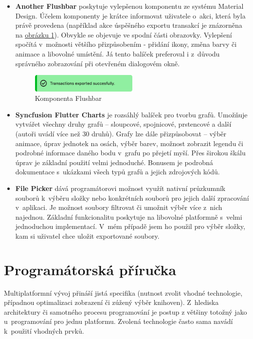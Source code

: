 \documentclass[
  biblatex,
  figures=true,
  tables=false,
  glossaries,
  index
]{kidiplom}
\begin{document}
\begin{itemize}
  \item \textbf{Another Flushbar} \cite{flushbar} poskytuje vylepšenou komponentu  ze systému Material Design. Účelem komponenty je krátce informovat uživatele o~akci, která byla právě provedena (například akce úspěšného exportu transakcí je znázorněna na \hyperref[fig:flushbar]{obrázku \ref{fig:flushbar}}). Obvykle se objevuje ve spodní části obrazovky. Vylepšení spočítá v~možnosti většího přizpůsobením - přidání ikony, změna barvy či animace a libovolné umístění. Já tento balíček preferoval i z~důvodu správného zobrazování při otevřeném dialogovém okně.

  \begin{figure}
    \centering
    \includegraphics[width=0.5\textwidth]{images/flushbar.pdf}
    \caption{Komponenta Flushbar}
    \label{fig:flushbar}
  \end{figure}
      
  \item \textbf{Syncfusion Flutter Charts} \cite{syncfusion-charts} je rozsáhlý balíček pro tvorbu grafů. Umožňuje vytvářet všechny druhy grafů -- sloupcové, spojnicové, prstencové a další (autoři uvádí více než 30 druhů). Grafy lze dále přizpůsobovat -- výběr animace, úprav jednotek na osách, výběr barev, možnost zobrazit legendu či podrobné informace daného bodu v~grafu po přejetí myší. Přes širokou škálu úprav je základní použití velmi jednoduché. Bonusem je podrobná dokumentace s~ukázkami všech typů grafů a jejich zdrojových kódů.
  \item \textbf{File Picker} \cite{file-picker} dává programátorovi možnost využít nativní průzkumník souborů k~výběru složky nebo konkrétních souborů pro jejich další zpracování v~aplikaci. Je možnost soubory filtrovat či umožnit výběr více z~nich najednou. Základní funkcionalitu poskytuje na libovolné platformně s~velmi jednoduchou implementací. V~mém případě jsem ho použil pro výběr složky, kam si uživatel chce uložit exportované soubory. 
\end{itemize}


\section{Programátorská příručka}

Multiplatformní vývoj přináší jistá specifika (nutnost zvolit vhodné technologie, případnou optimalizaci zobrazení či zúžený výběr knihoven). Z~hlediska architektury či samotného procesu programování je postup z většiny totožný jako u~programování pro jednu platformu. Zvolená technologie často sama navádí k~použití vhodných prvků.
\end{document}
